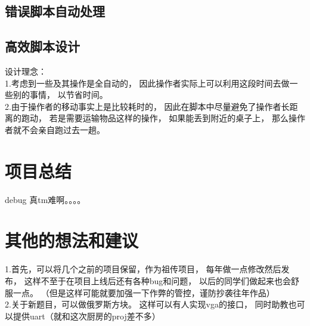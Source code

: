 \documentclass[12pt, a4paper]{ctexart}
\begin{document}
\subsection{错误脚本自动处理}

\subsection{高效脚本设计}
设计理念：\\
1.考虑到一些及其操作是全自动的，
因此操作者实际上可以利用这段时间去做一些别的事情，
以节省时间。\\
2.由于操作者的移动事实上是比较耗时的，
因此在脚本中尽量避免了操作者长距离的跑动，
若是需要运输物品这样的操作，
如果能丢到附近的桌子上，
那么操作者就不会亲自跑过去一趟。

\section{项目总结}
debug 真tm难啊。。。。


\section{其他的想法和建议}
1.首先，可以将几个之前的项目保留，作为祖传项目，
每年做一点修改然后发布，
这样不至于在项目上线后还有各种bug和问题，
以后的同学们做起来也会舒服一点。
（但是这样可能就要加强一下作弊的管控，谨防抄袭往年作品）\\
2.关于新题目，可以做俄罗斯方块。
这样可以有人实现vga的接口，
同时助教也可以提供uart（就和这次厨房的proj差不多）
\end{document}
